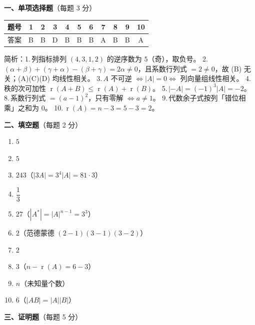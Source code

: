 \documentclass[12pt]{ctexart}
\newcommand{\rank}{\operatorname{r}}
\begin{document}
\noindent\textbf{一、单项选择题}（每题 3 分）\par\vspace{4pt}
\begin{center}
\renewcommand{\arraystretch}{1.3}
\begin{tabular}{|c|c|c|c|c|c|c|c|c|c|c|}
\hline
题号 & 1 & 2 & 3 & 4 & 5 & 6 & 7 & 8 & 9 & 10 \\\hline
答案 & B & B & D & B & B & B & A & B & B & A \\\hline
\end{tabular}
\end{center}
\noindent\small 简析：1.\,列指标排列 $(4,3,1,2)$ 的逆序数为 $5$（奇），取负号。
2.\,$(\alpha+\beta)+( \gamma+\alpha)-(\beta+\gamma)=2\alpha\neq0$，且系数行列式 $=2\neq0$，故 (B) 无关；(A)(C)(D) 均线性相关。
3.\,$A$ 不可逆 $\Leftrightarrow |A|=0\Leftrightarrow$ 列向量组线性相关。
4.\,秩的次可加性 $\rank(A+B)\leq\rank(A)+\rank(B)$。
5.\,$|-A|=(-1)^{3}|A|=-2$。
8.\,系数行列式 $=(a-1)^{2}$，只有零解 $\Leftrightarrow a\neq1$。
9.\,代数余子式按列「错位相乘」之和为 $0$。
10.\,$\rank(A)=n-3=5-3=2$。\normalsize

\vspace{10pt}
\noindent\textbf{二、填空题}（每题 2 分）\par\vspace{4pt}
\begin{enumerate}[label=\arabic*.,itemsep=3pt]
\item $5$ \hfill
\item $5$ \hfill
\item $243$（$|3A|=3^{4}|A|=81\cdot3$）\hfill
\item $\dfrac13$ \hfill
\item $27$（$|A^{*}|=|A|^{n-1}=3^{3}$）
\item $2$（范德蒙德 $(2-1)(3-1)(3-2)$）
\item $2$ \hfill
\item $3$（$n-\rank(A)=6-3$）
\item $n$（未知量个数）\hfill
\item $6$（$|AB|=|A||B|$）
\end{enumerate}

\vspace{6pt}
\noindent\textbf{三、证明题}（每题 5 分）
\end{document}
